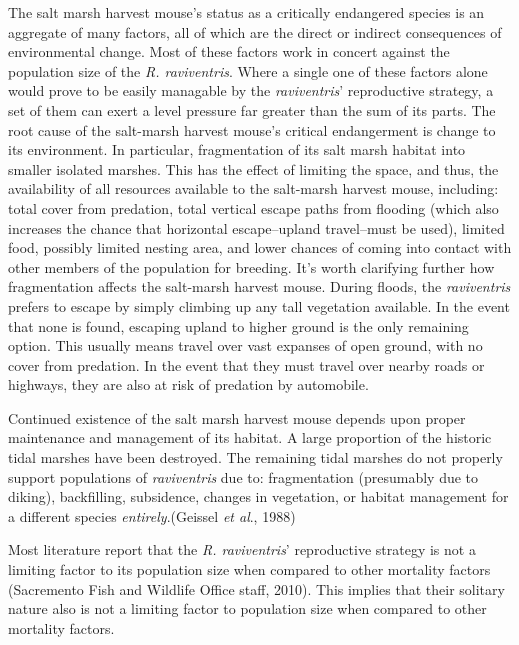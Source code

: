 \documentclass[a4paper]{article}
\begin{document}
The salt marsh harvest mouse's status as a critically endangered species is an aggregate of many factors, all of which are the direct or indirect consequences of environmental change. Most of these factors work in concert against the population size of the \textit{R. raviventris}. Where a single one of these factors alone would prove to be easily managable by the \textit{raviventris}' reproductive strategy, a set of them can exert a level pressure far greater than the sum of its parts. The root cause of the salt-marsh harvest mouse's critical endangerment is change to its environment. In particular, fragmentation of its salt marsh habitat into smaller isolated marshes. This has the effect of limiting the space, and thus, the availability of all resources available to the salt-marsh harvest mouse, including: total cover from predation, total vertical escape paths from flooding (which also increases the chance that horizontal escape--upland travel--must be used), limited food, possibly limited nesting area, and lower chances of coming into contact with other members of the population for breeding. It's worth clarifying further how fragmentation affects the salt-marsh  harvest mouse. During floods, the \textit{raviventris} prefers to escape by simply climbing up any tall vegetation available. In the event that none is found, escaping upland to higher ground is the only remaining option. This usually means travel over vast expanses of open ground, with no cover from predation. In the event that they must travel over nearby roads or highways, they are also at risk of predation by automobile.

Continued existence of the salt marsh harvest mouse depends upon proper maintenance and management of its habitat. A large proportion of the historic tidal marshes have been destroyed. The remaining tidal marshes do not properly support populations of \textit{raviventris} due to: fragmentation (presumably due to diking), backfilling, subsidence, changes in vegetation, or habitat management for a different species \textit{entirely}.(Geissel \textit{et al}., 1988)

Most literature report that the \textit{R. raviventris}' reproductive strategy is not a limiting factor to its population size when compared to other mortality factors (Sacremento Fish and Wildlife Office staff, 2010). This implies that their solitary nature also is not a limiting factor to population size when compared to other mortality factors.
\end{document}
